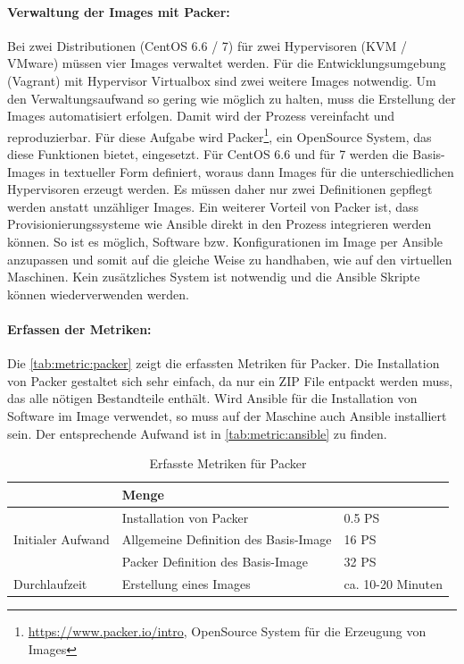 \paragraph{Verwaltung der Images mit Packer:}
Bei zwei Distributionen (CentOS 6.6 / 7) für zwei Hypervisoren (KVM / VMware) müssen vier Images verwaltet werden. Für die Entwicklungsumgebung (Vagrant) mit Hypervisor Virtualbox sind zwei weitere Images notwendig. Um den Verwaltungsaufwand so gering wie möglich zu halten, muss die Erstellung der Images automatisiert erfolgen. Damit wird der Prozess vereinfacht und reproduzierbar. Für diese Aufgabe wird Packer\footnote{\url{https://www.packer.io/intro}, OpenSource System für die Erzeugung von Images}, ein OpenSource System, das diese Funktionen bietet, eingesetzt. Für CentOS 6.6 und für 7 werden die Basis-Images in textueller Form definiert, woraus dann Images für die unterschiedlichen Hypervisoren erzeugt werden. Es müssen daher nur zwei Definitionen gepflegt werden anstatt unzähliger Images. Ein weiterer Vorteil von Packer ist, dass Provisionierungssysteme wie Ansible direkt in den Prozess integrieren werden können. So ist es möglich, Software bzw. Konfigurationen im Image per Ansible anzupassen und somit auf die gleiche Weise zu handhaben, wie auf den virtuellen Maschinen. Kein zusätzliches System ist notwendig und die Ansible Skripte können wiederverwenden werden.

\paragraph{Erfassen der Metriken:}
Die \autoref{tab:metric:packer} zeigt die erfassten Metriken für Packer. Die Installation von Packer gestaltet sich sehr einfach, da nur ein ZIP File entpackt werden muss, das alle nötigen Bestandteile enthält. Wird Ansible für die Installation von Software im Image verwendet, so muss auf der Maschine auch Ansible installiert sein. Der entsprechende Aufwand ist in \autoref{tab:metric:ansible} zu finden.

\begin{table}[ht]
\setlength{\tabcolsep}{5pt}
\renewcommand{\arraystretch}{1.5}
\centering
\begin{tabular}{|l|l|l|}
\hline
\rowcolor[HTML]{C0C0C0}
\multicolumn{2}{|c|}{\textbf{Metrik}} 				& \textbf{Menge}		\\ 
\hline
\multirow{3}{*}{Initialer Aufwand}	& Installation von Packer	& 0.5 PS			\\ 
\cline{2-3}
									& Allgemeine Definition des Basis-Image & 16 PS \\
\cline{2-3}
									& Packer Definition des Basis-Image & 32 PS	\\
\hline
Durchlaufzeit				 		& Erstellung eines Images & ca. 10-20 Minuten	\\ 
\hline
\end{tabular}
\caption{Erfasste Metriken für Packer}
\label{tab:metric:packer}
\end{table}

